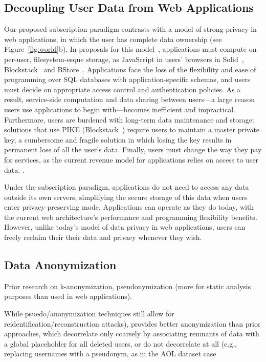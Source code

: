\subsection{Decoupling User Data from Web Applications}
Our proposed subscription paradigm contrasts with a model of strong privacy in web applications, in
which the user has complete data ownership (see Figure~\ref{fig:world}b). In proposals for this
model~\cite{solid, amber, w5, blockstack, bstore}, applications must compute on per-user, filesystem-esque
storage, \eg as JavaScript in users' browsers in Solid~\cite{solid}, Blockstack~\cite{blockstack} and
BStore~\cite{bstore}. Applications face the loss of the flexibility and ease of programming over SQL
databases with application-specific schemas, and users must decide on appropriate access control and
authentication policies. As a result, service-side computation and data sharing between users---a
large reason users use applications to begin with---becomes inefficient and impractical.
%
Furthermore, users are burdened with long-term data maintenance and storage: solutions that use PIKE
(\eg Blockstack~\cite{blockstack}) require users to maintain a
master private key, a cumbersome and fragile solution in which losing the key results in permanent
loss of all the user's data.
%
Finally, users must change the way they pay for services, as the current revenue model for
applications relies on access to user data.
.

Under the subscription paradigm, applications do not need to access any data outside its own
servers, simplifying the secure storage of this data when users enter privacy-preserving mode.
Applications can operate as they do today, with the current web architecture's performance and
programming flexibility benefits. However, unlike today's model of data privacy in web applications,
users can freely reclaim their their data and privacy whenever they wish.

\subsection{Data Anonymization}

Prior research on k-anonymization, pseudonymization (more for static analysis purposes than used in
web applications).

While psuedo/anonymization
techniques still allow for reidentification/reconstruction attacks), \name provides better
anonymization than prior approaches, which decorrelate only coarsely by associating remnants of data
with a global placeholder for all deleted users, or do not decorrelate at all (e.g., replacing
usernames with a pseudonym, as in the AOL dataset case~%

